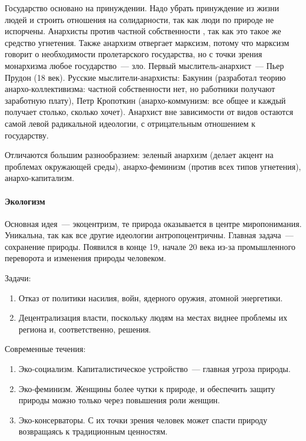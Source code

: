 \documentclass[12pt]{article}
\begin{document}
	\begin{note}[Взгляды]
		Государство основано на принуждении. Надо убрать принуждение из жизни людей и строить отношения на солидарности, так как люди по природе не испорчены. Анархисты против частной собственности , так как это такое же средство угнетения. Также анархизм отвергает марксизм, потому что марксизм говорит о необходимости пролетарского государства, но с точки зрения монархизма любое государство~--- зло. Первый мыслитель-анархист~--- Пьер Прудон (18 век). Русские мыслители-анархисты: Бакунин (разработал теорию анархо-коллективизма: частной собственности нет, но работники получают заработную плату), Петр Кропоткин (анархо-коммунизм: все общее и каждый получает столько, сколько хочет). Анархист вне зависимости от видов остаются самой левой радикальной идеологии, с отрицательным отношением к государству.
	\end{note}
	
	\begin{note}
		Отличаются большим разнообразием: зеленый анархизм (делает акцент на проблемах окружающей среды), анархо-феминизм (против всех типов угнетения), анархо-капитализм.
	\end{note}
	
	\paragraph{Экологизм}
	\begin{definition}
		Основная идея~--- экоцентризм, те природа оказывается в центре миропонимания. Уникальна, так как все другие идеологии антропоцентричны. Главная задача~--- сохранение природы. Появился в конце 19, начале 20 века из-за промышленного переворота и изменения природы человеком.
	\end{definition}
	\begin{note}
		Задачи:
		\begin{enumerate}
			\item Отказ от политики насилия, войн, ядерного оружия, атомной энергетики.
			\item Децентрализация власти, поскольку людям на местах виднее проблемы их региона и, соответственно, решения.
		\end{enumerate}
	\end{note}
	
	\begin{note}
		Современные течения:
		\begin{enumerate}
			\item Эко-социализм. Капиталистическое устройство~--- главная угроза природы.
			\item Эко-феминизм. Женщины более чутки к природе, и обеспечить защиту природы можно только через повышения роли женщин.
			\item Эко-консерваторы. С их точки зрения человек может спасти природу возвращаясь к традиционным ценностям.
		\end{enumerate}
	\end{note}
	
\end{document}
